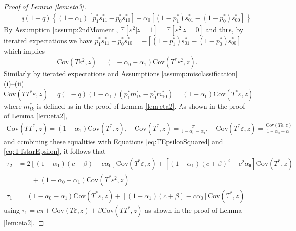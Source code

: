 \begin{proof}[Proof of Lemma \ref{lem:eta3}]
\begin{align*}
  &= q(1 - q)\left\{ (1 - \alpha_1)\left[p^*_1 s_{11}^* - p_0^* s_{10}^*\right] + \alpha_0 \left[ (1 - p_1^*)s_{01}^* - (1 - p_0^*) s_{00}^*\right] \right\}
\end{align*}
By Assumption \ref{assump:2ndMoment}, $\mathbb{E}[\varepsilon^2|z=1] = \mathbb{E}[\varepsilon^2|z=0]$ and thus, by iterated expectations we have
$p_1^* s_{11}^* - p_0^* s^*_{10} =  - \left[(1 - p_1^*)s_{01}^* - (1 - p_0^*)s_{00}^* \right]$
which implies 
\begin{equation}
  \mbox{Cov}(T\varepsilon^2,z) = (1 - \alpha_0 - \alpha_1)\mbox{Cov}(T^*\varepsilon^2,z).
  \label{eq:TEpsilonSquared}
\end{equation}
Similarly by iterated expectations and Assumptions \ref{assump:misclassification} (i)--(ii)
\begin{equation}
  \mbox{Cov}(TT^*\varepsilon, z) = q(1 - q)(1 - \alpha_1)(p_1^* m_{1k}^* - p_0^* m_{10}^*) = (1 - \alpha_1) \mbox{Cov}(T^*\varepsilon, z) 
  \label{eq:TTstarEpsilon}
\end{equation}
where $m_{tk}^*$ is defined as in the proof of Lemma \ref{lem:eta2}.
As shown in the proof of Lemma \ref{lem:eta2}, 
\begin{align*}
  \mbox{Cov}(TT^*,z) = (1 - \alpha_1) \mbox{Cov}(T^*,z), \quad
  \mbox{Cov}(T^*,z) = \frac{\pi}{1 - \alpha_0 - \alpha_1}, \quad
  \mbox{Cov}(T^*\varepsilon,z) = \frac{\mbox{Cov}(T\varepsilon,z)}{1 - \alpha_0 - \alpha_1}
\end{align*}
and combining these equalities with Equations \ref{eq:TEpsilonSquared} and \ref{eq:TTstarEpsilon}, it follows that
\begin{align*}
  \tau_2 &=  2\left[(1 - \alpha_1)(c + \beta) - c \alpha_0\right]\mbox{Cov}(T^*\varepsilon,z) + \left[(1 - \alpha_1)(c + \beta)^2 - c^2 \alpha_0 \right]\mbox{Cov}(T^*,z)\\
  &\quad \quad +(1 - \alpha_0 - \alpha_1)\mbox{Cov}(T^*\varepsilon^2,z) \\
  \tau_1 &= (1 - \alpha_0 - \alpha_1)\mbox{Cov}(T^*\varepsilon,z) + \left[(1 - \alpha_1)(c + \beta) - c \alpha_0\right] \mbox{Cov}(T^*,z)
\end{align*}
using $\tau_1 = c\pi + \mbox{Cov}(T\varepsilon,z) + \beta\mbox{Cov}(TT^*,z)$ as shown in the proof of Lemma \ref{lem:eta2}.

\end{proof}
